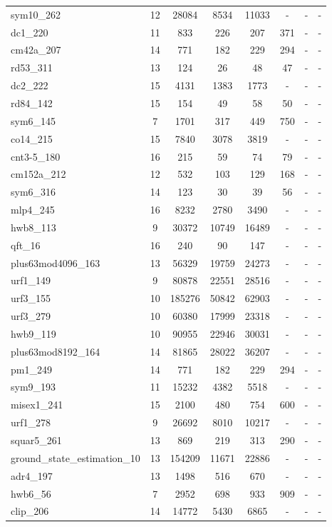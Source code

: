 \documentclass[journal]{IEEEtran}
\begin{document}
\begin{table*}[htbp]
\begin{center}
\begin{tabular}{|p{4.3cm}<{\centering}|c|c|c|c|c|c|c|}
sym10\_262 & 12 & 28084 & 8534 & 11033 & - & -& - \\
dc1\_220 & 11 & 833 & 226 & 207 & 371 & -& - \\
cm42a\_207 & 14 & 771 & 182 & 229 & 294 & -& - \\
rd53\_311 & 13 & 124 & 26 & 48 & 47 & -& - \\
dc2\_222 & 15 & 4131 & 1383 & 1773 & - & -& - \\
rd84\_142 & 15 & 154 & 49 & 58 & 50 & -& - \\
sym6\_145 & 7 & 1701 & 317 & 449 & 750 & -& - \\
co14\_215 & 15 & 7840 & 3078 & 3819 & - & -& - \\
cnt3-5\_180 & 16 & 215 & 59 & 74 & 79 & -& - \\
cm152a\_212 & 12 & 532 & 103 & 129 & 168 & -& - \\
sym6\_316 & 14 & 123 & 30 & 39 & 56 & -& - \\
mlp4\_245 & 16 & 8232 & 2780 & 3490 & - & -& - \\
hwb8\_113 & 9 & 30372 & 10749 & 16489 & - & -& - \\
qft\_16 & 16 & 240 & 90 & 147 & - & -& - \\
plus63mod4096\_163 & 13 & 56329 & 19759 & 24273 & - & -& - \\
urf1\_149 & 9 & 80878 & 22551 & 28516 & - & -& - \\
urf3\_155 & 10 & 185276 & 50842 & 62903 & - & -& - \\
urf3\_279 & 10 & 60380 & 17999 & 23318 & - & -& - \\
hwb9\_119 & 10 & 90955 & 22946 & 30031 & - & -& - \\
plus63mod8192\_164 & 14 & 81865 & 28022 & 36207 & - & -& - \\
pm1\_249 & 14 & 771 & 182 & 229 & 294 & -& - \\
sym9\_193 & 11 & 15232 & 4382 & 5518 & - & -& - \\
misex1\_241 & 15 & 2100 & 480 & 754 & 600 & -& - \\
urf1\_278 & 9 & 26692 & 8010 & 10217 & - & -& - \\
squar5\_261 & 13 & 869 & 219 & 313 & 290 & -& - \\
ground\_state\_estimation\_10 & 13 & 154209 & 11671 & 22886 & - & -& - \\
adr4\_197 & 13 & 1498 & 516 & 670 & - & -& - \\
hwb6\_56 & 7 & 2952 & 698 & 933 & 909 & -& - \\
clip\_206 & 14 & 14772 & 5430 & 6865 & - & -& - \\

\end{tabular}
\end{center}
\end{table*}
\end{document}
